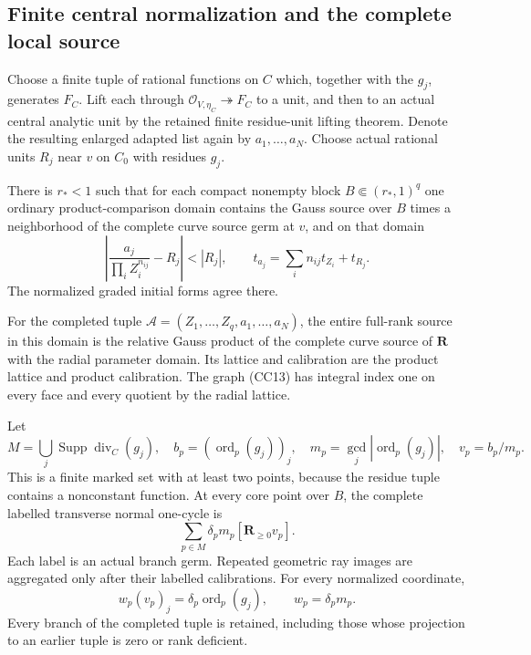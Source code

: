 \subsection{Finite central normalization and the complete local source}

Choose a finite tuple of rational functions on \(C\) which,
together with the \(g_j\), generates \(F_C\).  Lift each through
\(\mathcal O_{V,\eta_C}\twoheadrightarrow F_C\) to a unit,
and then to an actual central analytic unit by the retained
finite residue-unit lifting theorem.  Denote the resulting
enlarged adapted list again by \(a_1,\ldots,a_N\).
Choose actual rational units \(R_j\) near \(v\) on \(C_0\)
with residues \(g_j\).

\begin{theorem}
\label{thm:r13-cc-complete-marked-block}
There is \(r_*<1\) such that for each compact nonempty block
\(B\Subset(r_*,1)^q\) one ordinary product-comparison domain
contains the Gauss source over \(B\) times a neighborhood of
the complete curve source germ at \(v\), and on that domain
\[
 \left|\frac{a_j}{\prod_i Z_i^{n_{ij}}}-R_j\right|<|R_j|,
 \qquad
 t_{a_j}=\sum_i n_{ij}t_{Z_i}+t_{R_j}.
 \tag{CC13}
\]
The normalized graded initial forms agree there.

For the completed tuple
\(\mathcal A=(Z_1,\ldots,Z_q,a_1,\ldots,a_N)\), the entire
full-rank source in this domain is the relative Gauss product
of the complete curve source of \(\mathbf R\) with the radial
parameter domain.  Its lattice and calibration are the product
lattice and product calibration.  The graph (CC13) has integral
index one on every face and every quotient by the radial lattice.

Let
\[
 M=\bigcup_j\operatorname{Supp}\operatorname{div}_C(g_j),
 \quad b_p=(\operatorname{ord}_p(g_j))_j,
 \quad m_p=\gcd_j |\operatorname{ord}_p(g_j)|,
 \quad v_p=b_p/m_p.
 \tag{CC14}
\]
This is a finite marked set with at least two points, because the
residue tuple contains a nonconstant function.  At every core point over
\(B\), the complete labelled transverse normal one-cycle is
\[
              \sum_{p\in M}\delta_pm_p
                              [\mathbf R_{\geq0}v_p].
 \tag{CC15}
\]
Each label is an actual branch germ.  Repeated geometric ray
images are aggregated only after their labelled calibrations.
For every normalized coordinate,
\[
       w_p(v_p)_j=\delta_p\operatorname{ord}_p(g_j),
       \qquad w_p=\delta_pm_p.
 \tag{CC16}
\]
Every branch of the completed tuple is retained, including those
whose projection to an earlier tuple is zero or rank deficient.
\end{theorem}

